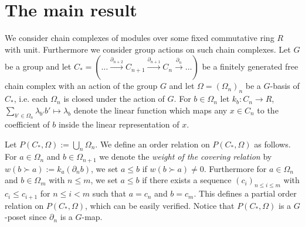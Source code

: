 \documentclass{elsarticle}
\begin{document}
\section{The main result}
We consider chain complexes of modules over some fixed commutative ring $R$ with unit. Furthermore we consider group actions on such chain complexes. Let $G$ be a group and let $C_*=(\dots\overset{\partial_{n+2}}\longrightarrow C_{n+1}\overset{\partial_{n+1}}\longrightarrow C_n\overset{\partial_n}\longrightarrow\dots)$ be a finitely generated free chain complex with an action of the group $G$ and let $\Omega=(\Omega_n)_n$ be a $G$-basis of $C_*$, i.e. each $\Omega_n$ is closed under the action of $G$. For $b\in\Omega_n$ let $k_b:C_n\longrightarrow R$, $\sum_{b'\in\Omega_n}\lambda_{b'}b'\longmapsto\lambda_b$ denote the linear function which maps any $x\in C_n$ to the coefficient of $b$ inside the linear representation of $x$.

Let $P(C_*,\Omega):=\bigcup_n\Omega_n$. We define an order relation on $P(C_*,\Omega)$ as follows. For $a\in\Omega_n$ and $b\in\Omega_{n+1}$ we denote the \emph{weight of the covering relation} by $w(b\succ a):=k_a(\partial_n b)$, we set $a\leq b$ if $w(b\succ a)\not=0$. Furthermore for $a\in\Omega_n$ and $b\in\Omega_m$ with $n\leq m$, we set $a\leq b$ if there exists a sequence $(c_i)_{n\leq i\leq m}$ with $c_i\leq c_{i+1}$ for $n\leq i<m$ such that $a=c_n$ and $b=c_m$. This defines a partial order relation on $P(C_*,\Omega)$, which can be easily verified. Notice that $P(C_*,\Omega)$ is a $G$-poset since $\partial_n$ is a $G$-map.
\end{document}
